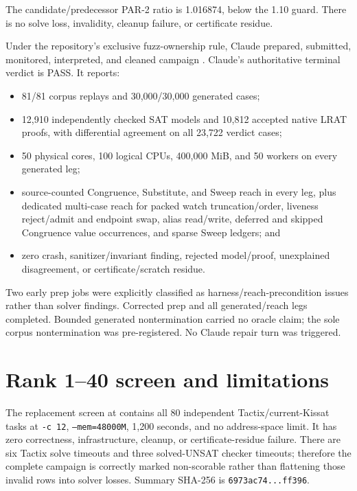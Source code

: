 \documentclass[11pt]{article}
\newcommand{\ok}{\textcolor{green!50!black}{PASS}}
\newcommand{\code}[1]{\texttt{#1}}
\begin{document}
The candidate/predecessor PAR-2 ratio is 1.016874, below the 1.10 guard.  There
is no solve loss, invalidity, cleanup failure, or certificate residue.

Under the repository's exclusive fuzz-ownership rule, Claude prepared,
submitted, monitored, interpreted, and cleaned campaign
.  Claude's
authoritative terminal verdict is \ok.  It reports:

\begin{itemize}
  \item 81/81 corpus replays and 30,000/30,000 generated cases;
  \item 12,910 independently checked SAT models and 10,812 accepted native
  LRAT proofs, with differential agreement on all 23,722 verdict cases;
  \item 50 physical cores, 100 logical CPUs, 400,000 MiB, and 50 workers on
  every generated leg;
  \item source-counted Congruence, Substitute, and Sweep reach in every leg,
  plus dedicated multi-case reach for packed watch truncation/order, liveness
  reject/admit and endpoint swap, alias read/write, deferred and skipped
  Congruence value occurrences, and sparse Sweep ledgers; and
  \item zero crash, sanitizer/invariant finding, rejected model/proof,
  unexplained disagreement, or certificate/scratch residue.
\end{itemize}

Two early prep jobs were explicitly classified as harness/reach-precondition
issues rather than solver findings.  Corrected prep and all generated/reach
legs completed.  Bounded generated nontermination carried no oracle claim; the
sole corpus nontermination was pre-registered.  No Claude repair turn was
triggered.

\section{Rank 1--40 screen and limitations}

The replacement screen at
contains all 80 independent Tactix/current-Kissat tasks at \code{-c 12},
\code{--mem=48000M}, 1,200 seconds, and no address-space limit.  It has zero
correctness, infrastructure, cleanup, or certificate-residue failure.  There
are six Tactix solve timeouts and three solved-UNSAT checker timeouts; therefore
the complete campaign is correctly marked non-scorable rather than flattening
those invalid rows into solver losses.  Summary SHA-256 is
\code{6973ac74...ff396}.
\end{document}
